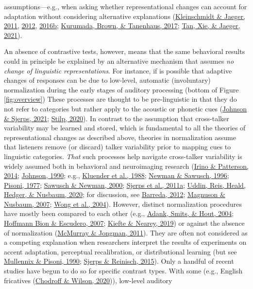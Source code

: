 \documentclass[
  11pt,
  english,
  man,floatsintext]{apa6}
\begin{document}
assumptions---e.g., when asking whether representational changes can account for adaptation without considering alternative explanations (\protect\hyperlink{ref-kleinschmidt-jaeger2011}{Kleinschmidt \& Jaeger, 2011}, \protect\hyperlink{ref-kleinschmidt-jaeger2012}{2012}, \protect\hyperlink{ref-kleinschmidt-jaeger2016cogsci}{2016b}; \protect\hyperlink{ref-kurumada2017}{Kurumada, Brown, \& Tanenhaus, 2017}; \protect\hyperlink{ref-tan2021}{Tan, Xie, \& Jaeger, 2021}).

An absence of contrastive tests, however, means that the same behavioral results could in principle be explained by an alternative mechanism that assumes \emph{no change of linguistic representations}. For instance, if is possible that adaptive changes of responses can be due to low-level, automatic (involuntary) normalization during the early stages of auditory processing (bottom of Figure \ref{fig:overview}) These processes are thought to be pre-linguistic in that they do not refer to categories but rather apply to the acoustic or phonetic cues (\protect\hyperlink{ref-johnson-sjerps2021}{Johnson \& Sjerps, 2021}; \protect\hyperlink{ref-stilp2020}{Stilp, 2020}). In contrast to the assumption that cross-talker variability may be learned and stored, which is fundamental to all the theories of representational changes as described above, theories in normalization assume that listeners remove (or discard) talker variability prior to mapping cues to linguistic categories. \emph{That} such processes help navigate cross-talker variability is widely assumed both in behavioral and neuroimaging research (\protect\hyperlink{ref-irino-patterson2014}{Irino \& Patterson, 2014}; \protect\hyperlink{ref-johnson1990}{Johnson, 1990}; e.g., \protect\hyperlink{ref-kluender1988}{Kluender et al., 1988}; \protect\hyperlink{ref-newman-sawusch1996}{Newman \& Sawusch, 1996}; \protect\hyperlink{ref-pisoni1977}{Pisoni, 1977}; \protect\hyperlink{ref-sawusch-newman2000}{Sawusch \& Newman, 2000}; \protect\hyperlink{ref-sjerps2011}{Sjerps et al., 2011a}; \protect\hyperlink{ref-uddin2020}{Uddin, Reis, Heald, Hedger, \& Nusbaum, 2020}; for discussion, see \protect\hyperlink{ref-barreda2012}{Barreda, 2012}; \protect\hyperlink{ref-magnuson-nusbaum2007}{Magnuson \& Nusbaum, 2007}; \protect\hyperlink{ref-wong2004}{Wong et al., 2004}). However, distinct normalization procedures have mostly been compared to each other (e.g., \protect\hyperlink{ref-adank2004}{Adank, Smits, \& Hout, 2004}; \protect\hyperlink{ref-hoffmanbion-escudero2007}{Hoffmann Bion \& Escudero, 2007}; \protect\hyperlink{ref-kiefte-nearey2019}{Kiefte \& Nearey, 2019}) or against the absence of normalization (\protect\hyperlink{ref-mcmurray-jongman2011}{McMurray \& Jongman, 2011}). They are often not considered as a competing explanation when researchers interpret the results of experiments on accent adaptation, perceptual recalibration, or distributional learning (but see \protect\hyperlink{ref-mullennix-pisoni1990}{Mullennix \& Pisoni, 1990}; \protect\hyperlink{ref-sjerps-reinisch2015}{Sjerps \& Reinisch, 2015}). Only a handful of recent studies have begun to do so for specific contrast types. With some (e.g., English fricatives (\protect\hyperlink{ref-chodroff-wilson2020}{Chodroff \& Wilson, 2020})), low-level auditory 
\end{document}
